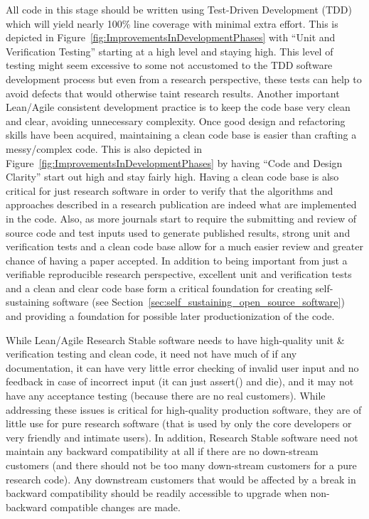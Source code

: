 \documentclass[11pt]{SANDreport}
\begin{document}
All code in this stage should be written using Test-Driven Development
(TDD) which will yield nearly 100\% line coverage with minimal extra
effort.  This is depicted in
Figure~\ref{fig:ImprovementsInDevelopmentPhases} with ``Unit and
Verification Testing'' starting at a high level and staying high.
This level of testing might seem excessive to some not accustomed to
the TDD software development process but even from a research
perspective, these tests can help to avoid defects that would
otherwise taint research results.  Another important Lean/Agile
consistent development practice is to keep the code base very clean
and clear, avoiding unnecessary complexity.  Once good design and
refactoring skills have been acquired, maintaining a clean code base is
easier than crafting a messy/complex code.  This is also depicted in
Figure~\ref{fig:ImprovementsInDevelopmentPhases} by having ``Code and
Design Clarity'' start out high and stay fairly high.  Having a clean
code base is also critical for just research software in order to
verify that the algorithms and approaches described in a research
publication are indeed what are implemented in the code.  Also, as
more journals start to require the submitting and review of source code
and test inputs used to generate published results, strong unit and
verification tests and a clean code base allow for a much easier
review and greater chance of having a paper accepted.  In addition to
being important from just a verifiable reproducible research
perspective, excellent unit and verification tests and a clean and
clear code base form a critical foundation for creating
self-sustaining software (see
Section~\ref{sec:self_sustaining_open_source_software}) and providing
a foundation for possible later productionization of the code.

While Lean/Agile Research Stable software needs to have high-quality
unit \& verification testing and clean code, it need not have much of
if any documentation, it can have very little error checking of
invalid user input and no feedback in case of incorrect input (it can
just assert() and die), and it may not have any acceptance testing
(because there are no real customers).  While addressing these issues
is critical for high-quality production software, they are of little
use for pure research software (that is used by only the core
developers or very friendly and intimate users).  In addition,
Research Stable software need not maintain any backward compatibility
at all if there are no down-stream customers (and there should not be
too many down-stream customers for a pure research code).  Any
downstream customers that would be affected by a break in backward
compatibility should be readily accessible to upgrade when non-backward
compatible changes are made.
\end{document}
